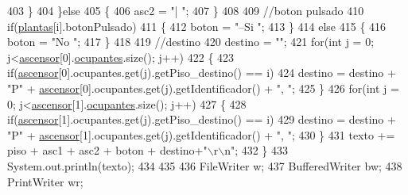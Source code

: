 \begin{DoxyCode}
403                 \}
404             \}\textcolor{keywordflow}{else}
405             \{
406                 asc2 = \textcolor{stringliteral}{"|            "};
407             \}
408             
409             \textcolor{comment}{//boton pulsado}
410             \textcolor{keywordflow}{if}(\mbox{\hyperlink{classpecl6part1_1_1_controlador_af8149da8845735945b38d7a29a50e397}{plantas}}[i].botonPulsado)
411             \{
412                 boton = \textcolor{stringliteral}{"--Si               "};
413             \}
414             \textcolor{keywordflow}{else}
415             \{
416                 boton = \textcolor{stringliteral}{"No                 "};
417             \}
418             
419             \textcolor{comment}{//destino}
420             destino = \textcolor{stringliteral}{""};
421             \textcolor{keywordflow}{for}(\textcolor{keywordtype}{int} j = 0; j<\mbox{\hyperlink{classpecl6part1_1_1_controlador_ab1a946290b47216d355b09da476486db}{ascensor}}[0].\mbox{\hyperlink{classpecl6part1_1_1_ascensor_aabf71a3bf26b3bff458534e518835c71}{ocupantes}}.size(); j++)
422             \{
423                 \textcolor{keywordflow}{if}(\mbox{\hyperlink{classpecl6part1_1_1_controlador_ab1a946290b47216d355b09da476486db}{ascensor}}[0].ocupantes.get(j).getPiso\_destino() == i)
424                     destino = destino + \textcolor{stringliteral}{"P"} + \mbox{\hyperlink{classpecl6part1_1_1_controlador_ab1a946290b47216d355b09da476486db}{ascensor}}[0].ocupantes.get(j).getIdentificador() + \textcolor{stringliteral}{", 
      "};
425             \}
426             \textcolor{keywordflow}{for}(\textcolor{keywordtype}{int} j = 0; j<\mbox{\hyperlink{classpecl6part1_1_1_controlador_ab1a946290b47216d355b09da476486db}{ascensor}}[1].\mbox{\hyperlink{classpecl6part1_1_1_ascensor_aabf71a3bf26b3bff458534e518835c71}{ocupantes}}.size(); j++)
427             \{
428                 \textcolor{keywordflow}{if}(\mbox{\hyperlink{classpecl6part1_1_1_controlador_ab1a946290b47216d355b09da476486db}{ascensor}}[1].ocupantes.get(j).getPiso\_destino() == i)
429                     destino = destino + \textcolor{stringliteral}{"P"} + \mbox{\hyperlink{classpecl6part1_1_1_controlador_ab1a946290b47216d355b09da476486db}{ascensor}}[1].ocupantes.get(j).getIdentificador() + \textcolor{stringliteral}{", 
      "};
430             \}
431             texto += piso + asc1 + asc2 + boton + destino+\textcolor{stringliteral}{"\(\backslash\)r\(\backslash\)n"};
432         \}
433         System.out.println(texto);
434         
435         
436         FileWriter w;
437         BufferedWriter bw;
438         PrintWriter wr;

\end{DoxyCode}
